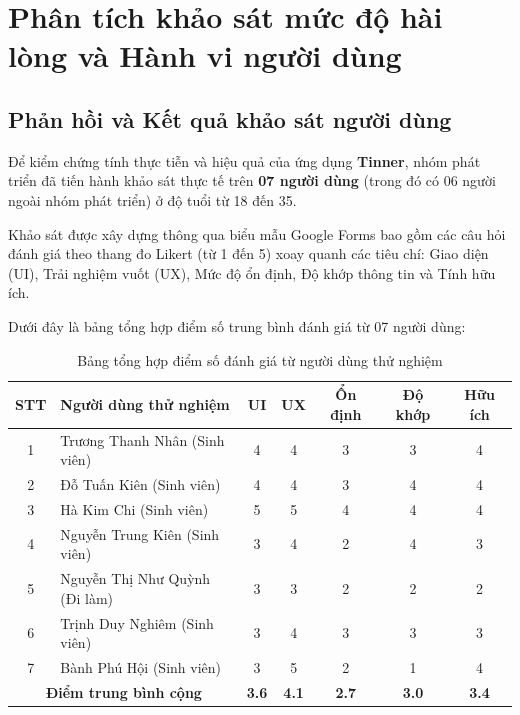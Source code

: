 \section{Phân tích khảo sát mức độ hài lòng và Hành vi người dùng}
\label{sec:user_satisfaction}

\subsection{Phản hồi và Kết quả khảo sát người dùng}
\label{subsec:survey_results}

Để kiểm chứng tính thực tiễn và hiệu quả của ứng dụng \textbf{Tinner}, nhóm phát triển đã tiến hành khảo sát thực tế trên \textbf{07 người dùng} (trong đó có 06 người ngoài nhóm phát triển) ở độ tuổi từ 18 đến 35. 

Khảo sát được xây dựng thông qua biểu mẫu Google Forms bao gồm các câu hỏi đánh giá theo thang đo Likert (từ 1 đến 5) xoay quanh các tiêu chí: Giao diện (UI), Trải nghiệm vuốt (UX), Mức độ ổn định, Độ khớp thông tin và Tính hữu ích.

Dưới đây là bảng tổng hợp điểm số trung bình đánh giá từ 07 người dùng:

\begin{table}[H]
\centering
\begin{tabular}{|c|l|c|c|c|c|c|}
\hline
\textbf{STT} & \textbf{Người dùng thử nghiệm} & \textbf{UI} & \textbf{UX} & \textbf{Ổn định} & \textbf{Độ khớp} & \textbf{Hữu ích} \\ \hline
1 & Trương Thanh Nhân (Sinh viên) & 4 & 4 & 3 & 3 & 4 \\ \hline
2 & Đỗ Tuấn Kiên (Sinh viên) & 4 & 4 & 3 & 4 & 4 \\ \hline
3 & Hà Kim Chi (Sinh viên) & 5 & 5 & 4 & 4 & 4 \\ \hline
4 & Nguyễn Trung Kiên (Sinh viên) & 3 & 4 & 2 & 4 & 3 \\ \hline
5 & Nguyễn Thị Như Quỳnh (Đi làm) & 3 & 3 & 2 & 2 & 2 \\ \hline
6 & Trịnh Duy Nghiêm (Sinh viên) & 3 & 4 & 3 & 3 & 3 \\ \hline
7 & Bành Phú Hội (Sinh viên) & 3 & 5 & 2 & 1 & 4 \\ \hline
\multicolumn{2}{|c|}{\textbf{Điểm trung bình cộng}} & \textbf{3.6} & \textbf{4.1} & \textbf{2.7} & \textbf{3.0} & \textbf{3.4} \\ \hline
\end{tabular}
\caption{Bảng tổng hợp điểm số đánh giá từ người dùng thử nghiệm}
\label{tab:survey_details}
\end{table}

